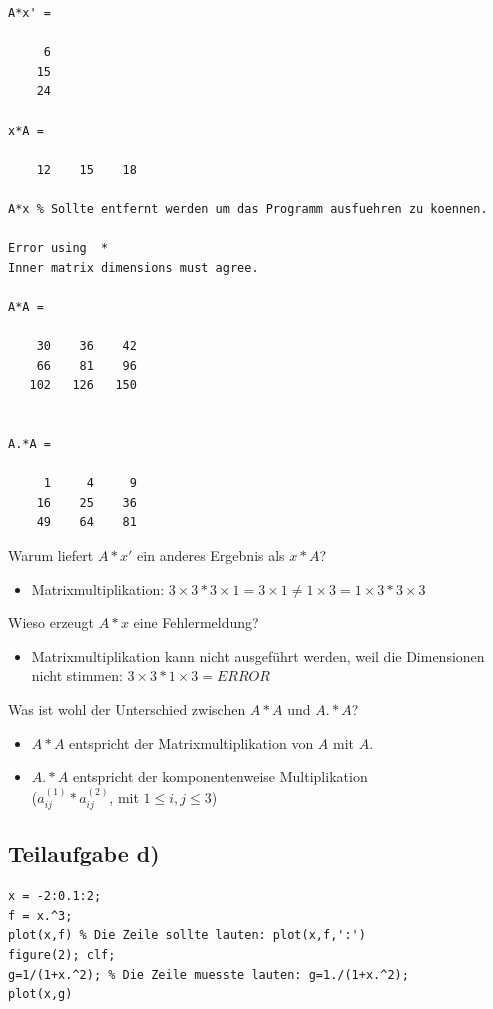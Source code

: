 \documentclass{llncs}
\begin{document}
\begin{verbatim}
A*x' =

     6
    15
    24
    
x*A =

    12    15    18

A*x % Sollte entfernt werden um das Programm ausfuehren zu koennen.

Error using  * 
Inner matrix dimensions must agree.

A*A =

    30    36    42
    66    81    96
   102   126   150


A.*A =

     1     4     9
    16    25    36
    49    64    81
\end{verbatim}
Warum liefert $A*x'$ ein anderes Ergebnis als $x*A$?
\begin{itemize}
\item Matrixmultiplikation: $3 \times 3 * 3 \times 1 = 3 \times 1 \neq 1 \times 3 = 1 \times 3 * 3 \times 3$
\end{itemize}
Wieso erzeugt $A*x$ eine Fehlermeldung?
\begin{itemize}
\item Matrixmultiplikation kann nicht ausgef\"uhrt werden, weil die Dimensionen nicht stimmen: $3 \times 3 * 1 \times 3 = ERROR$
\end{itemize}
Was ist wohl der Unterschied zwischen $A*A$ und $A.*A$?
\begin{itemize}
\item $A*A$ entspricht der Matrixmultiplikation von $A$ mit $A$.
\item $A.*A$ entspricht der komponentenweise Multiplikation\\($a_{ij}^{(1)}*a_{ij}^{(2)}$, mit $1 \leq i,j \leq 3$)
\end{itemize}

\subsection*{Teilaufgabe d)}

\begin{verbatim}
x = -2:0.1:2;
f = x.^3;
plot(x,f) % Die Zeile sollte lauten: plot(x,f,':')
figure(2); clf;
g=1/(1+x.^2); % Die Zeile muesste lauten: g=1./(1+x.^2);
plot(x,g)
\end{verbatim}
\end{document}
